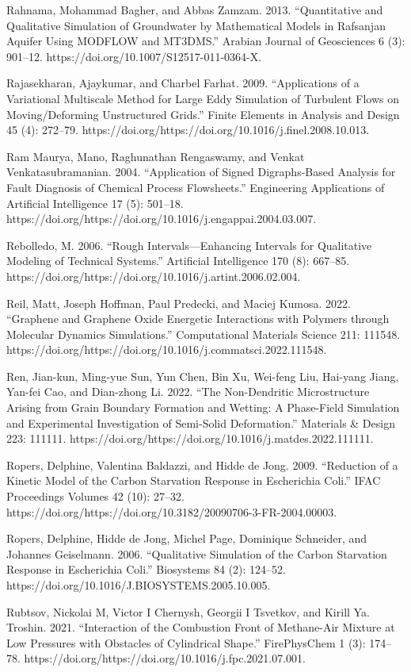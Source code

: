 \documentclass[utf8]{gradu3}
\begin{document}
Rahnama, Mohammad Bagher, and Abbas Zamzam. 2013. “Quantitative and Qualitative Simulation of Groundwater by Mathematical Models in Rafsanjan Aquifer Using MODFLOW and MT3DMS.” Arabian Journal of Geosciences 6 (3): 901–12. https://doi.org/10.1007/S12517-011-0364-X.

Rajasekharan, Ajaykumar, and Charbel Farhat. 2009. “Applications of a Variational Multiscale Method for Large Eddy Simulation of Turbulent Flows on Moving/Deforming Unstructured Grids.” Finite Elements in Analysis and Design 45 (4): 272–79. https://doi.org/https://doi.org/10.1016/j.finel.2008.10.013.

Ram Maurya, Mano, Raghunathan Rengaswamy, and Venkat Venkatasubramanian. 2004. “Application of Signed Digraphs-Based Analysis for Fault Diagnosis of Chemical Process Flowsheets.” Engineering Applications of Artificial Intelligence 17 (5): 501–18. https://doi.org/https://doi.org/10.1016/j.engappai.2004.03.007.

Rebolledo, M. 2006. “Rough Intervals—Enhancing Intervals for Qualitative Modeling of Technical Systems.” Artificial Intelligence 170 (8): 667–85. https://doi.org/https://doi.org/10.1016/j.artint.2006.02.004.

Reil, Matt, Joseph Hoffman, Paul Predecki, and Maciej Kumosa. 2022. “Graphene and Graphene Oxide Energetic Interactions with Polymers through Molecular Dynamics Simulations.” Computational Materials Science 211: 111548. https://doi.org/https://doi.org/10.1016/j.commatsci.2022.111548.

Ren, Jian-kun, Ming-yue Sun, Yun Chen, Bin Xu, Wei-feng Liu, Hai-yang Jiang, Yan-fei Cao, and Dian-zhong Li. 2022. “The Non-Dendritic Microstructure Arising from Grain Boundary Formation and Wetting: A Phase-Field Simulation and Experimental Investigation of Semi-Solid Deformation.” Materials \& Design 223: 111111. https://doi.org/https://doi.org/10.1016/j.matdes.2022.111111.

Ropers, Delphine, Valentina Baldazzi, and Hidde de Jong. 2009. “Reduction of a Kinetic Model of the Carbon Starvation Response in Escherichia Coli.” IFAC Proceedings Volumes 42 (10): 27–32. https://doi.org/https://doi.org/10.3182/20090706-3-FR-2004.00003.

Ropers, Delphine, Hidde de Jong, Michel Page, Dominique Schneider, and Johannes Geiselmann. 2006. “Qualitative Simulation of the Carbon Starvation Response in Escherichia Coli.” Biosystems 84 (2): 124–52. https://doi.org/10.1016/J.BIOSYSTEMS.2005.10.005.

Rubtsov, Nickolai M, Victor I Chernysh, Georgii I Tsvetkov, and Kirill Ya. Troshin. 2021. “Interaction of the Combustion Front of Methane-Air Mixture at Low Pressures with Obstacles of Cylindrical Shape.” FirePhysChem 1 (3): 174–78. https://doi.org/https://doi.org/10.1016/j.fpc.2021.07.001.
\end{document}
